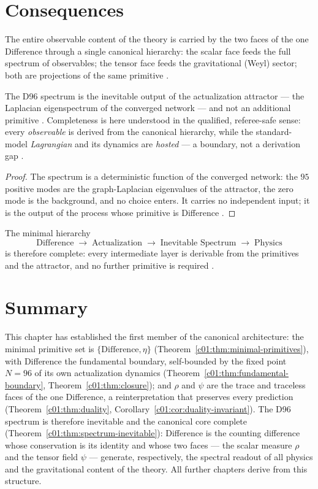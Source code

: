 \section{Consequences}
\label{c01:sec:consequences}

The entire observable content of the theory is carried by the two faces of the one Difference
through a single canonical hierarchy: the scalar face feeds the full spectrum of observables;
the tensor face feeds the gravitational (Weyl) sector; both are projections of the same
primitive \cite{c01:QG286,c01:QG301}.

\begin{theorem}
\label{c01:thm:spectrum-inevitable}
The D96 spectrum is the inevitable output of the actualization attractor --- the Laplacian
eigenspectrum of the converged network --- and not an additional primitive \cite{c01:QG295}.
Completeness is here understood in the qualified, referee-safe sense: every \emph{observable}
is derived from the canonical hierarchy, while the standard-model \emph{Lagrangian} and its
dynamics are \emph{hosted} --- a boundary, not a derivation gap \cite{c01:MONO007}.
\end{theorem}

\begin{proof}
The spectrum is a deterministic function of the converged network: the $95$ positive modes
are the graph-Laplacian eigenvalues of the attractor, the zero mode is the background, and no
choice enters. It carries no independent input; it is the output of the process whose
primitive is Difference \cite{c01:QG295,c01:QG282}.
\end{proof}

The minimal hierarchy
\[
\text{Difference}\;\longrightarrow\;\text{Actualization}\;\longrightarrow\;\text{Inevitable Spectrum}\;\longrightarrow\;\text{Physics}
\]
is therefore complete: every intermediate layer is derivable from the primitives and the
attractor, and no further primitive is required \cite{c01:QG292,c01:QG294}.

\section{Summary}
\label{c01:sec:summary}

This chapter has established the first member of the canonical architecture: the minimal
primitive set is $\{\text{Difference},\eta\}$ (Theorem~\ref{c01:thm:minimal-primitives}),
with Difference the fundamental boundary, self-bounded by the fixed point $N=96$ of its own
actualization dynamics (Theorem~\ref{c01:thm:fundamental-boundary}, Theorem~\ref{c01:thm:closure});
and $\rho$ and $\psi$ are the trace and traceless faces of the one Difference, a
reinterpretation that preserves every prediction (Theorem~\ref{c01:thm:duality},
Corollary~\ref{c01:cor:duality-invariant}). The D96 spectrum is therefore inevitable and the
canonical core complete (Theorem~\ref{c01:thm:spectrum-inevitable}): Difference is the
counting difference whose conservation is its identity and whose two faces --- the scalar
measure $\rho$ and the tensor field $\psi$ --- generate, respectively, the spectral readout
of all physics and the gravitational content of the theory. All further chapters derive from
this structure.

